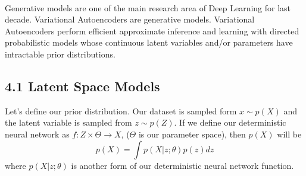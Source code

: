 \documentclass[11pt,twocolumn]{article}
\begin{document}
\\
\hspace*{0.5cm} Generative models are one of the main research area of Deep Learning for last decade. Variational Autoencoders are generative models. Variational Autoencoders perform efficient approximate inference and learning with directed probabilistic models whose continuous latent variables and/or parameters have intractable prior distributions. 
\subsection{4.1 Latent Space Models}
\hspace*{0.5cm} Let's define our prior distribution. Our dataset is sampled form $x \sim p(X)$ and the latent variable is sampled from $z \sim p(Z)$. If we define our deterministic neural network as $f: Z \times \Theta \rightarrow X$, ($\Theta$ is our parameter space), then $p(X)$ will be
$$p(X) = \int p(X|z;\theta)p(z)dz$$
where $p(X|z;\theta)$ is another form of our deterministic neural network function.
\end{document}
